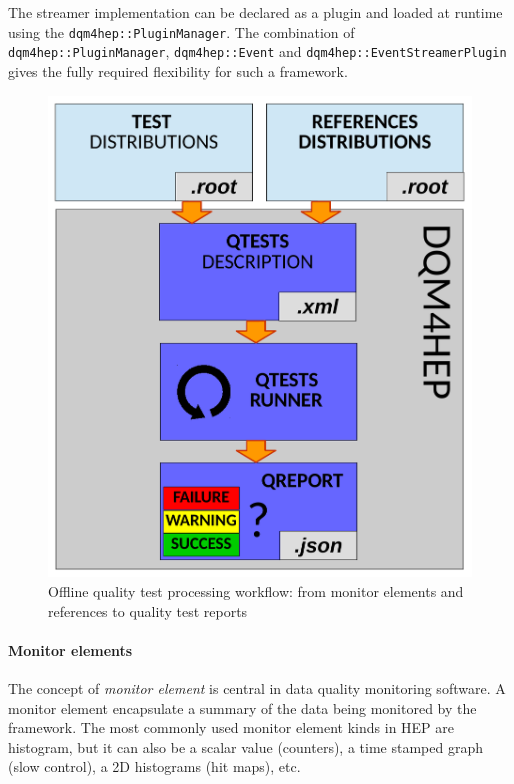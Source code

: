 \documentclass{webofc}
\begin{document}
The streamer implementation can be declared as a plugin and loaded at runtime using the \texttt{dqm4hep::PluginManager}. 
The combination of \texttt{dqm4hep::PluginManager}, \texttt{dqm4hep::Event} and \texttt{dqm4hep::EventStreamerPlugin} gives the 
fully required flexibility for such a framework. 

{ %

\begin{figure}
    \includegraphics[width=\linewidth]{figs/QTestRunner.pdf}
    \caption{Offline quality test processing workflow: from monitor elements and references to quality test reports}
    \label{fig:QTestsAndQReports}
\end{figure} 

\paragraph{Monitor elements}

The concept of \textit{monitor element} is central in data quality monitoring software.
A monitor element encapsulate a summary of the data being monitored by the framework.
The most commonly used monitor element kinds in HEP are histogram, but it can also be a scalar value (counters), a time stamped graph 
(slow control), a 2D histograms (hit maps), etc. 

}
\end{document}
